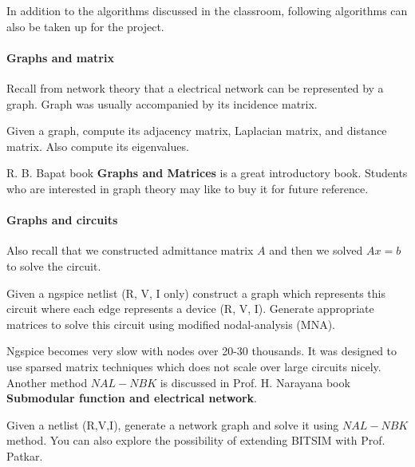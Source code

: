 In addition to the algorithms discussed in the classroom, following algorithms
can also be taken up for the project.

\paragraph{Graphs and matrix} 

Recall from network theory that a electrical network can be represented by a
graph. Graph was usually accompanied by its incidence matrix.

  \begin{problem}[15]
    Given a graph, compute its adjacency matrix, Laplacian matrix, and distance
    matrix. Also compute its eigenvalues.
  \end{problem}

\begin{remark}
  R. B. Bapat book \textbf{Graphs and Matrices} is a great introductory book.
  Students who are interested in graph theory may like to buy it for future
  reference.
\end{remark}

\paragraph{Graphs and circuits}

  Also recall that we constructed admittance matrix $A$ and then we solved
  $Ax=b$ to solve the circuit. 

  \begin{problem}[30]
     
     Given a ngspice netlist (R, V, I only) construct a graph which represents
     this circuit where each edge represents a device (R, V, I). Generate
     appropriate matrices to solve this circuit using modified nodal-analysis
     (MNA).

  \end{problem}

  Ngspice becomes very slow with nodes over 20-30 thousands. It was designed to
  use sparsed matrix techniques which does not scale over large circuits nicely.
  Another method $NAL-NBK$ is discussed in Prof. H. Narayana book \textbf{Submodular
  function and electrical network}.

  \begin{problem}[35] 
  
  Given a netlist (R,V,I), generate a network graph and solve it using $NAL-NBK$
  method. You can also explore the possibility of extending BITSIM with Prof.
  Patkar.  
  
  \end{problem}
    

